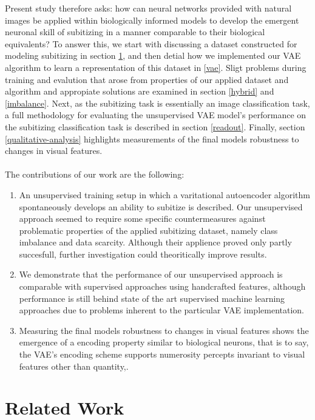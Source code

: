 \documentclass[twocolumn]{article}
\begin{document}
Present study therefore asks: how can neural networks provided with natural images be applied within biologically informed models to develop the emergent neuronal skill of subitizing in a manner comparable to their biological equivalents? To answer this, we start %
with discussing a dataset constructed for modeling subitizing in section \ref{related-work}, and then detial how we implemented our VAE algorithm to learn a representation of this dataset in \ref{vae}.  Sligt problems during training and evalution that arose from properties of our applied dataset and algorithm and appropiate solutions are examined in section \ref{hybrid}  and \ref{imbalance}.  Next, as the subitizing task is essentially an image classification task, a full
methodology for evaluating the unsupervised VAE model's performance on
the subitizing classification task is described in section \ref{readout}. Finally, section \ref{qualitative-analysis} highlights measurements of the final models robustness to changes in visual features.\\ \\
\noindent The contributions of our work are the following:
\begin{enumerate}[noitemsep,]
\item An unsupervised training setup in which a varitational autoencoder algorithm spontaneously develops an ability to subitize is described. Our unsupervised approach seemed to require some specific countermeasures against problematic properties of the applied subitizing dataset, namely class imbalance and data scarcity. Although their applience proved only partly succesfull, further investigation could theoritically improve results. 
\item We demonstrate that the
performance of our unsupervised approach is comparable with supervised
approaches using handcrafted features, although performance is still
behind state of the art supervised machine learning approaches due to
problems inherent to the particular VAE implementation. 
\item Measuring the final models robustness to changes in visual features
shows the emergence of a encoding property similar to biological neurons, that is
to say, the VAE's encoding scheme supports numerosity
percepts invariant to visual features other than quantity,.
\end{enumerate}

\hypertarget{related-work}{%
\section{Related Work}\label{related-work}}
\end{document}
